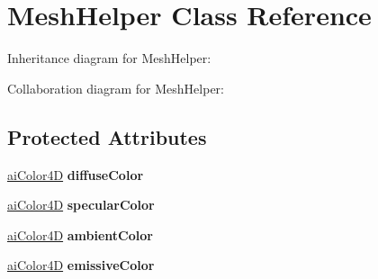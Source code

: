\hypertarget{interface_mesh_helper}{\section{Mesh\+Helper Class Reference}
\label{interface_mesh_helper}
}


Inheritance diagram for Mesh\+Helper\+:


Collaboration diagram for Mesh\+Helper\+:
\subsection*{Protected Attributes}
\begin{DoxyCompactItemize}
\item 
\hypertarget{interface_mesh_helper_a3fee10ca5505a7d436b61ab0e883bac8}{\hyperlink{structai_color4_d}{ai\+Color4\+D} {\bfseries diffuse\+Color}}\label{interface_mesh_helper_a3fee10ca5505a7d436b61ab0e883bac8}

\item 
\hypertarget{interface_mesh_helper_aebb989c08a6cb652720f78a41e215478}{\hyperlink{structai_color4_d}{ai\+Color4\+D} {\bfseries specular\+Color}}\label{interface_mesh_helper_aebb989c08a6cb652720f78a41e215478}

\item 
\hypertarget{interface_mesh_helper_aa8926dd57ae09a0492cb5c497f95e395}{\hyperlink{structai_color4_d}{ai\+Color4\+D} {\bfseries ambient\+Color}}\label{interface_mesh_helper_aa8926dd57ae09a0492cb5c497f95e395}

\item 
\hypertarget{interface_mesh_helper_a1000f351b95773896aabe489fefbbcd5}{\hyperlink{structai_color4_d}{ai\+Color4\+D} {\bfseries emissive\+Color}}\label{interface_mesh_helper_a1000f351b95773896aabe489fefbbcd5}

\end{DoxyCompactItemize}
